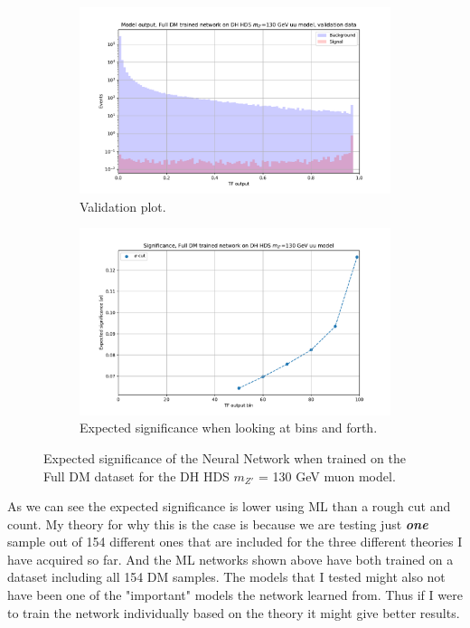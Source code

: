 \documentclass[14pt, a4paper]{book}
\begin{document}
\begin{figure}[!ht]
	\centering
	\begin{subfigure}[b]{0.8\textwidth}
        \centering
        \includegraphics[width=1\textwidth]{NN_VAL_uu.pdf}
        \caption{Validation plot.}\label{fig:NN_VAL_UU}
     \end{subfigure}
     \hfill
     \begin{subfigure}[b]{0.8\textwidth}
        \centering
        \includegraphics[width=1\textwidth]{NN_EXP_SIG_uu.pdf}
        \caption{Expected significance when looking at bins and forth.}\label{fig:NN_EXP_SIG:uu}
     \end{subfigure}
	\caption{Expected significance of the Neural Network when trained on the Full DM dataset for the DH HDS $m_{Z'}$ = 130 GeV muon model.}\label{fig:NN_SIG_FULL}
\end{figure}
\clearpage As we can see the expected significance is lower using ML than a rough cut and count. My theory for why this is the case is because we are testing just \textit{\textbf{one}} sample out of 154 different ones that are included for the three different theories I have acquired so far. And the ML networks shown above have both trained on a dataset including all 154 DM samples. The models that I tested might also not have been one of the "important" models the network learned from. Thus if I were to train the network individually based on the theory it might give better results.
\end{document}
